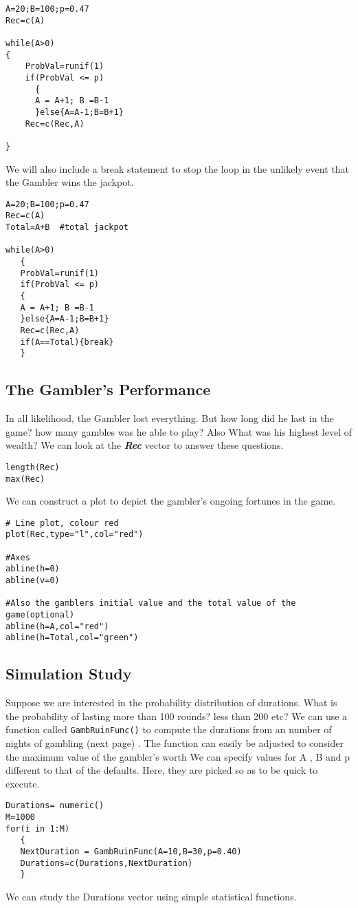 \documentclass[11pt]{article} %
\begin{document}
\begin{verbatim}
A=20;B=100;p=0.47
Rec=c(A)

while(A>0)
{
    ProbVal=runif(1)
    if(ProbVal <= p)
      {
      A = A+1; B =B-1
      }else{A=A-1;B=B+1}
    Rec=c(Rec,A)

}
\end{verbatim}

We will also include a break statement to stop the loop in the unlikely event that the Gambler wins the jackpot.

\begin{verbatim}
A=20;B=100;p=0.47
Rec=c(A)
Total=A+B  #total jackpot

while(A>0)
   { 
   ProbVal=runif(1)
   if(ProbVal <= p)
   {
   A = A+1; B =B-1
   }else{A=A-1;B=B+1}
   Rec=c(Rec,A)
   if(A==Total){break}
   }
\end{verbatim}


\subsection{The Gambler's Performance}
In all likelihood, the Gambler lost everything. But how long did he last in the game? how many gambles was he able to play? Also What was his highest level of wealth?
We can look at the \textbf{\textit{Rec}} vector to answer these questions.

\begin{verbatim}
length(Rec)
max(Rec)
\end{verbatim}


We can construct a plot to depict the gambler's ongoing fortunes in the game.

\begin{verbatim}
# Line plot, colour red
plot(Rec,type="l",col="red")

#Axes
abline(h=0)
abline(v=0)

#Also the gamblers initial value and the total value of the game(optional)
abline(h=A,col="red")
abline(h=Total,col="green")
\end{verbatim}


\subsection{Simulation Study}
Suppose we are interested in the probability distribution of durations. What is the probability of lasting more than 100 rounds? less than 200 etc? We can use a function called \texttt{GambRuinFunc()} to compute the durations from an number of nights of gambling (next page) . The function can easily be adjusted to consider the maximum value of the gambler's worth
We can specify values for A , B and p different to that of the defaults. Here, they are picked so as to be quick to execute.

\begin{verbatim}
Durations= numeric()
M=1000
for(i in 1:M)
   {
   NextDuration = GambRuinFunc(A=10,B=30,p=0.40)
   Durations=c(Durations,NextDuration)
   } 
\end{verbatim}


We can study the Durations vector  using simple statistical functions.
\end{document}
